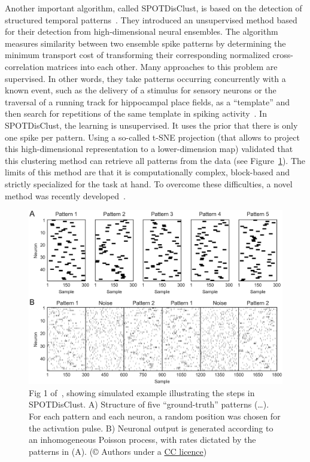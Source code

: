 \documentclass[brainsci, %
               review,submit,pdftex,moreauthors
               ]{Definitions/mdpi}
\begin{document}
Another important algorithm, called SPOTDisClust, is based on the detection of structured temporal patterns~\citep{grossberger_unsupervised_2018}. They introduced an unsupervised method based for their detection from high-dimensional neural ensembles. The algorithm measures similarity between two ensemble spike patterns by determining the minimum transport cost of transforming their corresponding normalized cross-correlation matrices into each other. Many approaches to this problem are supervised. In other words, they take patterns occurring concurrently with a known event, such as the delivery of a stimulus for sensory neurons or the traversal of a running track for hippocampal place fields, as a ``template'' and then search for repetitions of the same template in spiking activity~\citep{nadasdy_replay_1999,lee_combinatorial_2004}. In SPOTDisClust, the learning is unsupervised. It uses the prior that there is only one spike per pattern. Using a so-called t-SNE projection (that allows to project this high-dimensional representation to a lower-dimension map) validated that this clustering method can retrieve all patterns from the data (see Figure~\ref{fig:SPOTDisClust}). The limits of this method are that it is computationally complex, block-based and strictly specialized for the task at hand. To overcome these difficulties, a novel method was recently developed~\citep{sotomayor-gomez_spikeship_2021}.

\begin{figure}
\centering
\includegraphics[width=\linewidth]{figures/pcbi.1006283.g001.png}%
\caption{Fig 1 of~\citep{grossberger_unsupervised_2018}, showing simulated example illustrating the steps in SPOTDisClust. A) Structure of five ``ground-truth'' patterns (\ldots). For each pattern and each neuron, a random position was chosen for the activation pulse. B) Neuronal output is generated according to an inhomogeneous Poisson process, with rates dictated by the patterns in (A). (© Authors under a \href{https://journals.plos.org/ploscompbiol/article?id=10.1371/journal.pcbi.1006283}{CC licence})}\label{fig:SPOTDisClust}
\end{figure}
%
\end{document}
